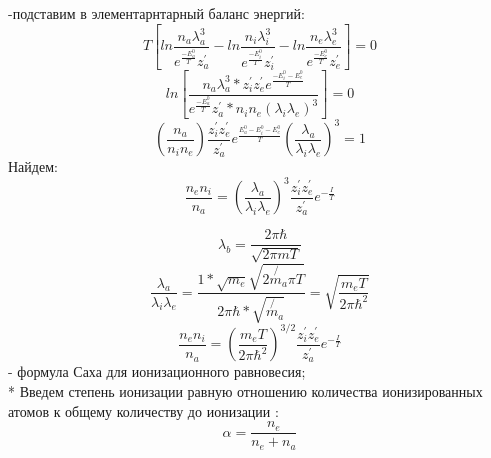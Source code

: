 \documentclass[letterpaper,12pt]{article}
\begin{document}
-подставим в элементарнтарный баланс энергий:
\begin{equation} \label{eq:aperp} %
T[ln{\frac{n_a \lambda_{a}^{3}}{e^{\frac{-E_{a}^{0}}{T}}z_{a}^{'}}- ln{\frac{n_i \lambda_{i}^{3}}{e^{\frac{-E_{i}^{0}}{T}}z_{i}^{'}}}} - ln{\frac{n_e \lambda_{e}^{3}}{e^{\frac{-E_{e}^{0}}{T}}z_{e}^{'}}} ]=0 
\end{equation}
\begin{equation} \label{eq:aperp} %
ln[\frac{n_a \lambda_{a}^{3}* {z}_{i}^{'}{z}_{e}^{'}e^{\frac{-E_{i}^{0}-E_{e}^{0}}{T}}}{e^{\frac{-E_{a}^{0}}{T}}z_{a}^{'}* n_i n_e(\lambda_i \lambda_e)^3}]=0 
\end{equation}
\begin{equation} \label{eq:aperp} %
(\frac{n_a}{n_i n_e}) \frac{z_{i}^{'}z_{e}^{'}}{z_{a}^{'}}e^\frac{E_{a}^{0}-E_{i}^{0}-E_{e}^{0}}{T}(\frac{\lambda_a}{\lambda_i \lambda_e})^3=1 
\end{equation}
Найдем:
\begin{equation} \label{eq:aperp} %
\frac{n_e n_i}{n_a}=(\frac{\lambda_a}{\lambda_i \lambda_e})^3\frac{z_{i}^{'}z_{e}^{'}}{z_{a}^{'}}e^{-\frac{I}{T}} 
\end{equation}

\begin{equation} \label{eq:aperp} %
\lambda_b= \frac{2 \pi \hbar}{\sqrt{2 \pi m T}}
\end{equation}
\begin{equation} \label{eq:aperp} %
\frac{\lambda_a}{\lambda_i \lambda_e}=\frac{1* \sqrt{m_e} \sqrt{2 \not{m_a} \pi T}}{2 \pi \hbar * \sqrt{\not{m_a}}}= \sqrt{\frac{m_eT}{2 \pi \hbar^2}}
\end{equation}
\begin{equation} \label{eq:aperp} %
\frac{n_e n_i}{n_a} = (\frac{m_eT}{2 \pi \hbar^2})^{3/2}\frac{z_{i}^{'}z_{e}^{'}}{z_{a}^{'}}e^{-\frac{I}{T}}
\end{equation}
- формула Саха для ионизационного равновесия;
\\*
Введем степень ионизации равную отношению количества ионизированных атомов к общему количеству до ионизации :
\begin{equation} \label{eq:aperp} %
\alpha= \frac{n_e}{n_e+n_a}
\end{equation}
\end{document}

